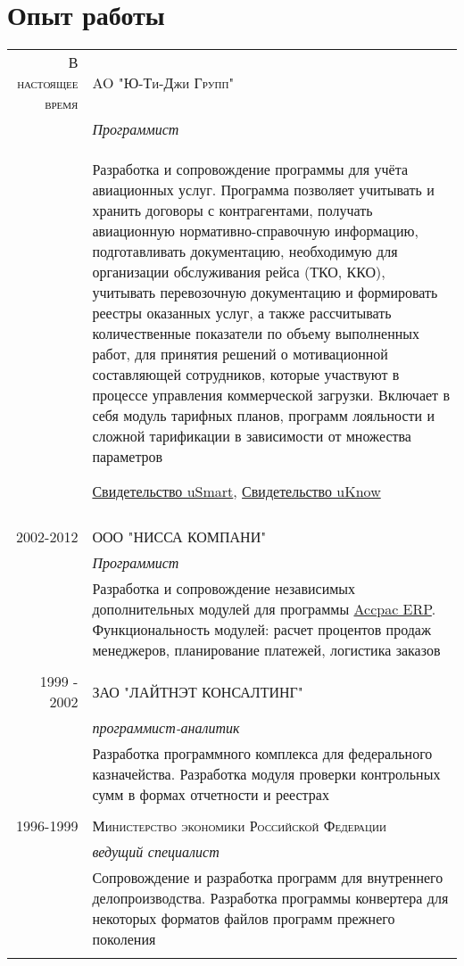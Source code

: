 \documentclass[a4paper,10pt]{article}
\begin{document}
\section{Опыт работы}
\begin{tabular}{r|p{11cm}}


\textsc{В настоящее время}& \textsc{AO "Ю-Ти-Джи Групп" } \\\textsc{}&\emph{Программист}\\&
\footnotesize{
Разработка и сопровождение программы для учёта авиационных услуг. Программа
позволяет учитывать и хранить договоры с контрагентами, получать авиационную
нормативно-справочную информацию, подготавливать документацию, необходимую для
организации обслуживания рейса (ТКО, ККО), учитывать перевозочную документацию и
формировать реестры оказанных услуг, а также рассчитывать количественные показатели по
объему выполненных работ, для принятия решений о мотивационной составляющей
сотрудников, которые участвуют в процессе управления коммерческой загрузки. 
Включает в себя модуль тарифных планов, программ лояльности и сложной тарификации 
в зависимости от множества параметров

\href{https://flightphone.github.io/uSmart.pdf}{Свидетельство uSmart}, \href{https://flightphone.github.io/uKnow.pdf}{Свидетельство uKnow}
}\\\multicolumn{2}{c}{}\\

\textsc{2002-2012}& \textsc{ООО "НИССА КОМПАНИ" } \\\textsc{}&\emph{Программист}\\&
\footnotesize{Разработка и сопровождение независимых дополнительных модулей для программы \href{https://www.accpacnet.com/}{Accpac ERP}. Функциональность модулей: расчет процентов продаж менеджеров, планирование платежей, логистика заказов}\\\multicolumn{2}{c}{}\\

\textsc{1999 - 2002}& \textsc{ЗАО "ЛАЙТНЭТ КОНСАЛТИНГ"} \\\textsc{}&\emph{программист-аналитик}\\&
\footnotesize{Разработка программного комплекса для федерального казначейства. Разработка модуля проверки контрольных сумм в формах отчетности и реестрах}\\\multicolumn{2}{c}{}\\

\textsc{1996-1999}& \textsc{Министерство экономики Российской Федерации}  \\\textsc{}&\emph{ведущий специалист}\\&
\footnotesize{Сопровождение и разработка программ для внутреннего делопроизводства. 
Разработка программы конвертера для некоторых форматов файлов программ прежнего поколения}\\\multicolumn{2}{c}{} \\
 

\end{tabular}
\end{document}
